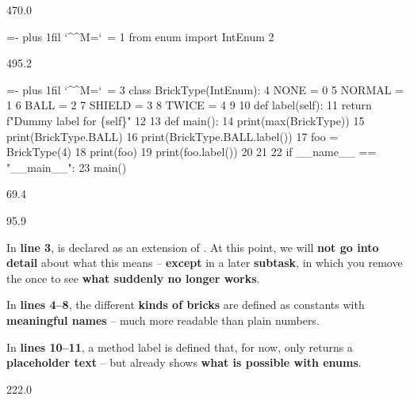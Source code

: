 \documentclass{aslab}
\makeatletter
\newcommand*\kw[1]{\textcolor{codeorange}{#1}}
\newcommand*\fn[1]{\textcolor{codecyan}{#1}}
\newcommand*\num[1]{\textcolor{codered}{#1}}
\newcommand*\imp[1]{\textcolor{codemagenta}{#1}}
\newenvironment{pycode}{\par\ttfamily\hyphenchar\font=-1
  \lineskiplimit=-\maxdimen\lineskip=0pt\parindent=0pt
  \parfillskip=0pt plus 1fil\relax
  \catcode`\^^M=\active\catcode`\ =\active\py@setup\py@gobble}{}
\makeatother
\begin{document}
\begin{region}[pitch=13.2]{470.0}
\begin{pycode}
  \kw{1} \imp{from} enum \imp{import} IntEnum
  \kw{2}
\end{pycode}
\end{region}
\begin{region}[]{495.2}
\begin{pycode}
  \kw{3 class} \fn{BrickType}(IntEnum):
  \kw{4}     NONE = \num{0}
  \kw{5}     NORMAL = \num{1}
  \kw{6}     BALL = \num{2}
  \kw{7}     SHIELD = \num{3}
  \kw{8}     TWICE = \num{4}
  \kw{9}
 \kw{10}     \kw{def} \fn{label}(self):
 \kw{11}         \kw{return} f\num{"Dummy label for \{self\}"}
 \kw{12}
 \kw{13 def} \fn{main}():
 \kw{14}     \fn{print}(\fn{max}(BrickType))
 \kw{15}     \fn{print}(BrickType.BALL)
 \kw{16}     \fn{print}(BrickType.BALL.label())
 \kw{17}     foo = BrickType(\num{4})
 \kw{18}     \fn{print}(foo)
 \kw{19}     \fn{print}(foo.label())
 \kw{20}
 \kw{21}
 \kw{22 if} \_\_name\_\_ == \num{"\_\_main\_\_"}:
 \kw{23}     main()
\end{pycode}
\end{region}

\nextpage
\begin{region}{69.4}
\end{region}

\begin{region}[pitch=14.25]{95.9}
\begin{dashlist}
\item In \textbf{line 3},  is declared as an extension of
  . At this point, we will \textbf{not go into detail} about
  what this means -- \textbf{except} in a later \textbf{subtask}, in which you
  remove the  once to see \textbf{what suddenly no longer
  works}.
\item In \textbf{lines 4--8}, the different \textbf{kinds of bricks} are
  defined as constants with \textbf{meaningful names} -- much more readable
  than plain numbers.
\item In \textbf{lines 10--11}, a method label is defined that, for now, only
  returns a \textbf{placeholder text} -- but already shows \textbf{what is
  possible with enums}.
\end{dashlist}
\end{region}

\begin{region}{222.0}
\end{region}
\end{document}

